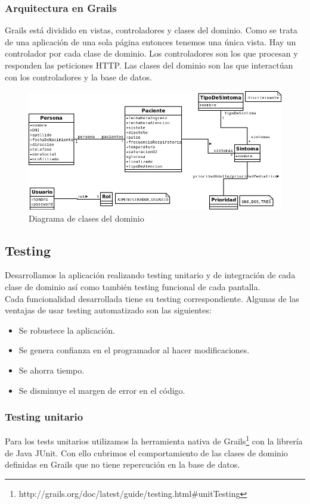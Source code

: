 \subsubsection{Arquitectura en Grails}
Grails está dividido en vistas, controladores y clases del dominio. Como se trata de una aplicación de una sola página entonces tenemos una única vista. Hay un controlador por cada clase de dominio. Los controladores son los que procesan y responden las peticiones HTTP. Las clases del dominio son las que interactúan con los controladores y la base de datos.
\begin{figure}[h]
\centering
\includegraphics[width=1.2\textwidth]{triage.png}
\caption{Diagrama de clases del dominio}
\end{figure}

\subsection{Testing}
Desarrollamos la aplicación realizando testing unitario y de integración de cada clase de dominio así como también testing funcional de cada pantalla.\\
Cada funcionalidad desarrollada tiene su testing correspondiente. Algunas de las ventajas de usar testing automatizado son las siguientes:
\begin{itemize}
\item Se robustece la aplicación.
\item Se genera confianza en el programador al hacer modificaciones.
\item Se ahorra tiempo.
\item Se disminuye el margen de error en el código.
\end{itemize}

\subsubsection{Testing unitario}
Para los tests unitarios utilizamos la herramienta nativa de Grails\footnote{http://grails.org/doc/latest/guide/testing.html\#unitTesting} con la librería de Java JUnit. Con ello cubrimos el comportamiento de las clases de dominio definidas en Grails que no tiene repercución en la base de datos.

